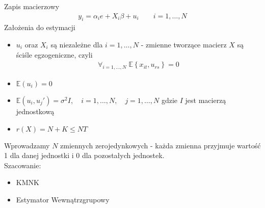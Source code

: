 Zapis macierzowy
\begin{gather*}
y_i=\alpha_ie+X_i\beta+u_i
\qquad i=1,\dots,N
\end{gather*}
Założenia do estymacji
\begin{itemize}
\item $ u_i $ oraz $ X_i $ są niezależne dla $ i=1,\dots,N $ - zmienne tworzące macierz $ X $ są ściśle egzogeniczne, czyli
\begin{gather*}
\forall_{i=1,\dots,N}\;
\mathbb E \left\{x_{it},u_{rs}\right\}=0
\end{gather*}
\item $ \mathbb E (u_i) =0$
\item $ \mathbb E(u_i,u_j')=\sigma^2 I,
\quad i=1,\dots,N, 
\quad j=1,\dots,N $ gdzie $ I $ jest macierzą jednostkową
\item $ r(X)=N+K\le NT $
\end{itemize}
Wprowadzamy $ N $ zmiennych zerojedynkowych - każda zmienna przyjmuje wartość 1 dla danej jednostki i 0 dla pozostałych jednostek.\\
Szacowanie:
\begin{itemize}
\item KMNK
\item Estymator Wewnątrzgrupowy
\end{itemize}
